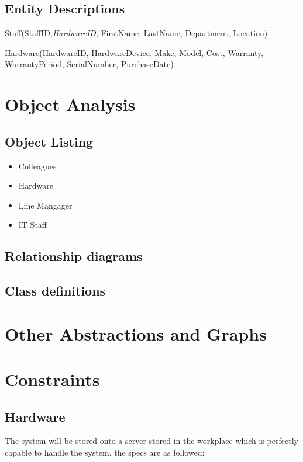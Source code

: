 \subsection{Entity Descriptions}

Staff(\underline{StaffID},\textit{HardwareID}, FirstName, LastName, Department, Location)

Hardware(\underline{HardwareID}, HardwareDevice, Make, Model, Cost, Warranty, \\WarrantyPeriod, SerialNumber, PurchaseDate)

\section{Object Analysis}

\subsection{Object Listing}

\begin{itemize}
\item Colleagues
\item Hardware
\item Line Mangager
\item IT Staff
\end{itemize}

\subsection{Relationship diagrams}

\subsection{Class definitions}

\section{Other Abstractions and Graphs}

\section{Constraints}

\subsection{Hardware}

The system will be stored onto a server stored in the workplace which is perfectly capable to handle the system, the specs are as followed:

